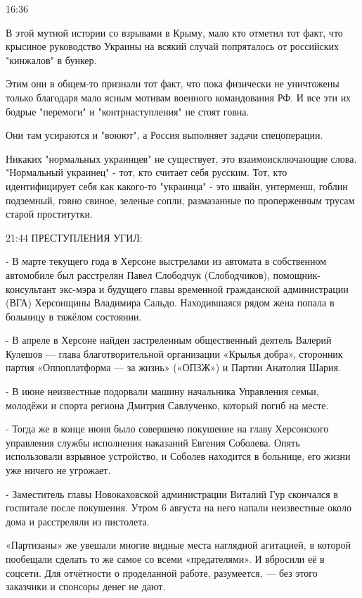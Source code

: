 16:36

В этой мутной истории со взрывами в Крыму, мало кто отметил тот факт, что
крысиное руководство Украины на всякий случай попряталось от российских
"кинжалов" в бункер.

Этим они в общем-то признали тот факт, что пока физически не уничтожены только
благодаря мало ясным мотивам военного командования РФ. И все эти их бодрые
"перемоги" и "контрнаступления" не стоят говна.

Они там усираются и "воюют", а Россия выполняет задачи спецоперации.


Никаких "нормальных украинцев" не существует, это взаимоисключающие слова.
"Нормальный украинец" - тот, кто считает себя русским. Тот, кто идентифицирует
себя как какого-то "украинца" - это швайн, унтерменш, гоблин подземный, говно
свиное, зеленые сопли, размазанные по проперженным трусам старой проститутки.

21:44
ПРЕСТУПЛЕНИЯ УГИЛ:

- В марте текущего года в Херсоне выстрелами из автомата в собственном
автомобиле был расстрелян Павел Слободчук (Слободчиков), помощник-консультант
экс-мэра и будущего главы временной гражданской администрации (ВГА) Херсонщины
Владимира Сальдо. Находившаяся рядом жена попала в больницу в тяжёлом
состоянии.

- В апреле в Херсоне найден застреленным общественный деятель Валерий Кулешов —
глава благотворительной организации «Крылья добра», сторонник партия
«Оппоплатформа — за жизнь» («ОПЗЖ») и Партии Анатолия Шария.

- В июне неизвестные подорвали машину начальника Управления семьи, молодёжи и
спорта региона Дмитрия Савлученко, который погиб на месте.

- Тогда же в конце июня было совершено покушение на главу Херсонского
управления службы исполнения наказаний Евгения Соболева. Опять использовали
взрывное устройство, и Соболев находится в больнице, его жизни уже ничего не
угрожает.

- Заместитель главы Новокаховской администрации Виталий Гур скончался в
госпитале после покушения. Утром 6 августа на него напали неизвестные около
дома и расстреляли из пистолета.

«Партизаны» же увешали многие видные места наглядной агитацией, в которой
пообещали сделать то же самое со всеми «предателями». И вбросили её в соцсети.
Для отчётности о проделанной работе, разумеется, — без этого заказчики и
спонсоры денег не дают.

